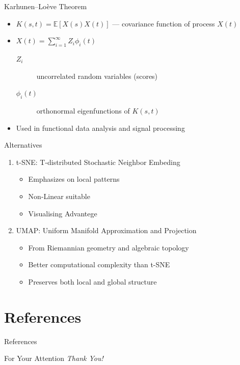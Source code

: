 \documentclass{beamer}
\begin{document}
\begin{frame}{Karhunen--Lo\`eve Theorem}
    \begin{itemize}
        \item $K(s,t) = \mathbb{E}[X(s)X(t)]$ — covariance function of process $X(t)$
        \item $X(t) = \sum_{i=1}^{\infty} Z_i \phi_i(t)$
        \begin{description}
            \item[$Z_i$] uncorrelated random variables (scores)
            \item[$\phi_i(t)$] orthonormal eigenfunctions of $K(s,t)$
        \end{description}
        \item Used in functional data analysis and signal processing
    \end{itemize}
\end{frame}

\begin{frame}{Alternatives}
    \begin{enumerate}
        \item  t-SNE: T-distributed Stochastic Neighbor Embeding \cite{JMLR:v9:vandermaaten08a}
    \begin{itemize}
        \item Emphasizes on local patterns
        \item Non-Linear suitable 
        \item Visualising Advantege
    \end{itemize}
    \item UMAP: Uniform Manifold Approximation and Projection \cite{McInnes_Healy_Melville_2018}
    \begin{itemize}
        \item From Riemannian geometry and algebraic topology
        \item Better computational complexity than t-SNE
        \item Preserves both local and global structure
    \end{itemize}
    \end{enumerate}

\end{frame}


\section{References}
\begin{frame}[allowframebreaks]{References}
    \printbibliography
\end{frame}

\begin{frame}{For Your Attention}
    \centering
    \Large
    \emph{Thank You!}
\end{frame}
\end{document}
